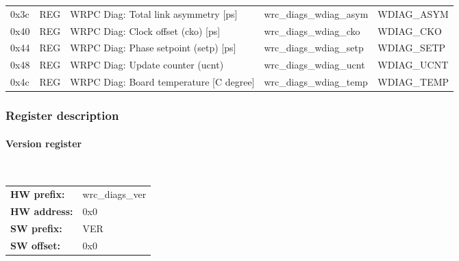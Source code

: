 {\begin{tabular}{|l|l|l|l|l|}
0x3c& REG & WRPC Diag: Total link asymmetry [ps] & wrc\_diags\_wdiag\_asym & WDIAG\_ASYM\\
0x40& REG & WRPC Diag: Clock offset (cko) [ps] & wrc\_diags\_wdiag\_cko & WDIAG\_CKO\\
0x44& REG & WRPC Diag: Phase setpoint (setp) [ps] & wrc\_diags\_wdiag\_setp & WDIAG\_SETP\\
0x48& REG & WRPC Diag: Update counter (ucnt) & wrc\_diags\_wdiag\_ucnt & WDIAG\_UCNT\\
0x4c& REG & WRPC Diag: Board temperature [C degree] & wrc\_diags\_wdiag\_temp & WDIAG\_TEMP\\
\hline
\end{tabular}
}

\subsubsection{Register description}
\paragraph*{Version register}\mbox{}\\\vskip 6pt
\begin{tabular}{l l }
{\bf HW prefix:}  & wrc\_diags\_ver\\
{\bf HW address:}  & 0x0\\
{\bf SW prefix:}  & VER\\
{\bf SW offset:}  & 0x0\\
\end{tabular}


\vspace{12pt}
\noindent
{}

